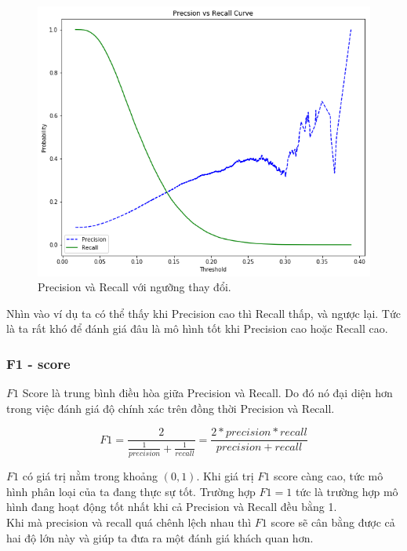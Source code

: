 \begin{figure}[H]
    \centering
    \includegraphics[scale = 0.7]{images/pic2.png}
    \caption{Precision và Recall với ngưỡng thay đổi.}
    \label{fig:PR}
\end{figure}
Nhìn vào ví dụ ta có thể thấy khi Precision cao thì Recall thấp, và ngược lại. Tức là ta rất khó để đánh giá đâu là mô hình tốt khi Precision cao hoặc Recall cao.
\subsubsection{F1 - score}
$F1$ Score là trung bình điều hòa giữa Precision và Recall. Do đó nó đại diện hơn trong việc đánh giá độ chính xác trên đồng thời Precision và Recall.
\begin{center}
    \[F1 = \frac{2}{\frac{1}{precision}+\frac{1}{recall}} = \frac{2*precision*recall}{precision+recall} \]
\end{center}
$F1$ có giá trị nằm trong khoảng $(0,1)$. Khi giá trị $F1$ score càng cao, tức mô hình phân loại của ta đang thực sự tốt. Trường hợp $F1 = 1$ tức là trường hợp mô hình đang hoạt động tốt nhất khi cả Precision và Recall đều bằng 1.\\
Khi mà precision và recall quá chênh lệch nhau thì  $F1$ score sẽ cân bằng được cả hai độ lớn này và giúp ta đưa ra một đánh giá khách quan hơn. 